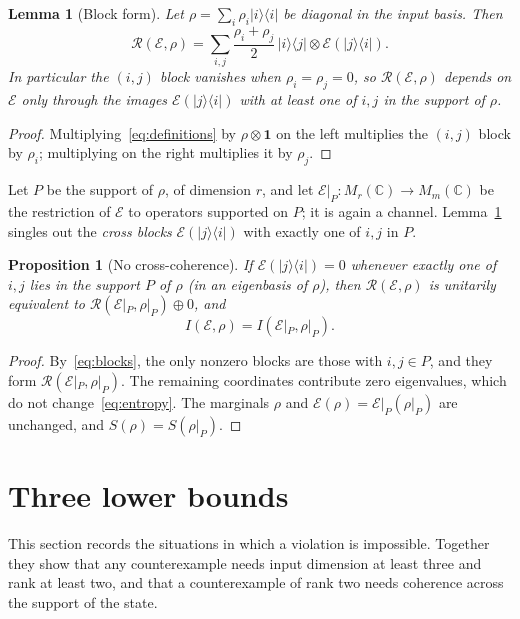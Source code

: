 \documentclass[11pt,a4paper]{article}
\newtheorem{proposition}[theorem]{Proposition}
\newtheorem{lemma}[theorem]{Lemma}
\theoremstyle{definition}\newtheorem{definition}[theorem]{Definition}
\theoremstyle{remark}\newtheorem{remark}[theorem]{Remark}
\newcommand{\ket}[1]{\lvert #1\rangle}
\newcommand{\bra}[1]{\langle #1\rvert}
\newcommand{\one}{\mathbf{1}}
\newcommand{\E}{\mathcal E}
\newcommand{\R}{\mathcal R}
\begin{document}
\begin{lemma}[Block form]\label{lem:blocks}
Let $\rho=\sum_i\rho_i\ket{i}\bra{i}$ be diagonal in the input basis. Then
\begin{equation}\label{eq:blocks}
 \R(\E,\rho)=\sum_{i,j}\frac{\rho_i+\rho_j}{2}\,\ket{i}\bra{j}\otimes\E(\ket{j}\bra{i}).
\end{equation}
In particular the $(i,j)$ block vanishes when $\rho_i=\rho_j=0$, so $\R(\E,\rho)$ depends on $\E$ only through the images $\E(\ket{j}\bra{i})$ with at least one of $i,j$ in the support of $\rho$.
\end{lemma}
\begin{proof}
Multiplying~\eqref{eq:definitions} by $\rho\otimes\one$ on the left multiplies the $(i,j)$ block by $\rho_i$; multiplying on the right multiplies it by $\rho_j$.
\end{proof}

Let $P$ be the support of $\rho$, of dimension $r$, and let $\E|_P:M_r(\mathbb C)\to M_m(\mathbb C)$ be the restriction of $\E$ to operators supported on $P$; it is again a channel. Lemma~\ref{lem:blocks} singles out the \emph{cross blocks} $\E(\ket{j}\bra{i})$ with exactly one of $i,j$ in $P$.

\begin{proposition}[No cross-coherence]\label{prop:nocross}
If $\E(\ket{j}\bra{i})=0$ whenever exactly one of $i,j$ lies in the support $P$ of $\rho$ (in an eigenbasis of $\rho$), then $\R(\E,\rho)$ is unitarily equivalent to $\R(\E|_P,\rho|_P)\oplus0$, and
\[
 I(\E,\rho)=I(\E|_P,\rho|_P).
\]
\end{proposition}
\begin{proof}
By~\eqref{eq:blocks}, the only nonzero blocks are those with $i,j\in P$, and they form $\R(\E|_P,\rho|_P)$. The remaining coordinates contribute zero eigenvalues, which do not change~\eqref{eq:entropy}. The marginals $\rho$ and $\E(\rho)=\E|_P(\rho|_P)$ are unchanged, and $S(\rho)=S(\rho|_P)$.
\end{proof}

\section{Three lower bounds}\label{sec:lower}
This section records the situations in which a violation is impossible. Together they show that any counterexample needs input dimension at least three and rank at least two, and that a counterexample of rank two needs coherence across the support of the state.
\end{document}
